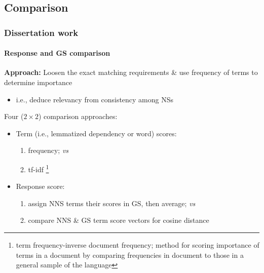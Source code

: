 \documentclass{beamer}
\begin{document}
\subsection{Comparison}
\begin{frame}
\frametitle{Dissertation work}
\framesubtitle{Response and GS comparison}

\textbf{Approach:} Loosen the exact matching requirements \& use
frequency of terms to determine importance
\begin{itemize}
\item i.e., deduce relevancy from consistency among NSs
\end{itemize}

\medskip

Four ($2 \times 2$) comparison approaches:

\begin{itemize}
\item Term (i.e., lemmatized dependency or word) scores:
\begin{enumerate}
\item frequency; \textit{vs} 
\item tf-idf \footnote{term frequency-inverse document frequency; method for scoring importance of terms in a document by comparing frequencies in document to those in a general sample of the language}
\end{enumerate}
\item Response score:
\begin{enumerate}
\item assign NNS terms their scores in GS, then average; \textit{vs}
\item compare NNS \& GS term score vectors for cosine distance
\end{enumerate}
\end{itemize}
\end{frame}
\end{document}
